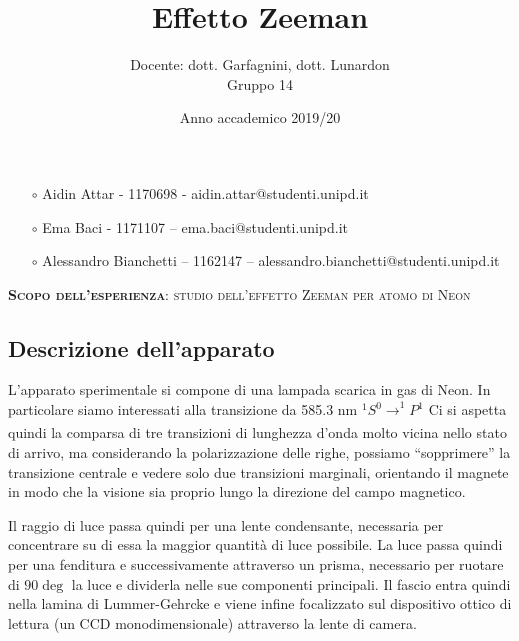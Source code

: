 \documentclass{article}
\title{Effetto Zeeman}
\author{Docente: dott. Garfagnini, dott. Lunardon \\
Gruppo 14}
\date{Anno accademico 2019/20}
\begin{document}
\maketitle

    \begin{itemize}
        \item[$\circ$] Aidin Attar - 1170698 - aidin.attar@studenti.unipd.it
        \item[$\circ$] Ema Baci - 1171107 – ema.baci@studenti.unipd.it
        \item[$\circ$] Alessandro Bianchetti – 1162147 – alessandro.bianchetti@studenti.unipd.it
    \end{itemize}

\vspace{3 cm}
\begin{large}\textsc{\textbf{Scopo dell'esperienza}: studio dell'effetto Zeeman per atomo di Neon} 
\end{large}
\vspace{8.5cm}



\twocolumn

\subsection*{Descrizione dell'apparato} 

L'apparato sperimentale si compone di una lampada  scarica in gas di Neon.
In particolare siamo interessati alla transizione da 585.3 nm 
$^1S^0 \xrightarrow[]{}  ^1P^1$ 
Ci si aspetta quindi la comparsa di tre transizioni di lunghezza d'onda molto vicina nello stato di arrivo, ma considerando la polarizzazione delle righe, possiamo “sopprimere” la transizione centrale e vedere solo due transizioni marginali, orientando il magnete in modo che la visione sia proprio lungo la direzione del campo magnetico.

Il raggio di luce passa quindi per una lente condensante, necessaria per concentrare su di essa la maggior quantità di luce possibile.
La luce passa quindi per una fenditura e successivamente attraverso un prisma, necessario per ruotare di $90\deg$ la luce e dividerla nelle sue componenti principali. Il fascio entra quindi nella lamina di Lummer-Gehrcke e viene infine focalizzato sul dispositivo ottico di lettura (un CCD monodimensionale) attraverso la lente di camera.
\end{document}

